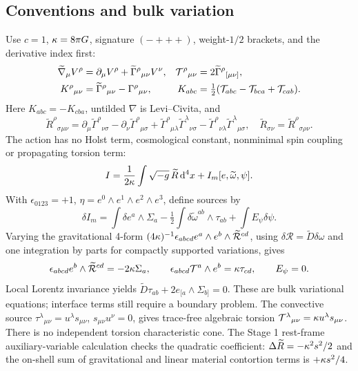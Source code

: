 \subsection{Conventions and bulk variation}
Use $c=1$, $\kappa=8\pi G$, signature $(-+++)$, weight-$1/2$ brackets, and the derivative index first:
\begin{align}
 \widetilde\nabla_\mu V^\rho&=\partial_\mu V^\rho+\widetilde\Gamma^\rho{}_{\mu\nu}V^\nu,&
 \mathcal T^\rho{}_{\mu\nu}&=2\widetilde\Gamma^\rho{}_{[\mu\nu]},\\
 K^\rho{}_{\mu\nu}&=\widetilde\Gamma^\rho{}_{\mu\nu}-\Gamma^\rho{}_{\mu\nu},&
 K_{abc}&=\tfrac12(\mathcal T_{abc}-\mathcal T_{bca}+\mathcal T_{cab}).
\end{align}
Here $K_{abc}=-K_{cba}$, untilded $\nabla$ is Levi--Civita, and
\begin{equation}
 \widetilde R^\rho{}_{\sigma\mu\nu}=\partial_\mu\widetilde\Gamma^\rho{}_{\nu\sigma}-\partial_\nu\widetilde\Gamma^\rho{}_{\mu\sigma}
 +\widetilde\Gamma^\rho{}_{\mu\lambda}\widetilde\Gamma^\lambda{}_{\nu\sigma}
 -\widetilde\Gamma^\rho{}_{\nu\lambda}\widetilde\Gamma^\lambda{}_{\mu\sigma},\quad
 \widetilde R_{\sigma\nu}=\widetilde R^\rho{}_{\sigma\rho\nu}.
\end{equation}
The action has no Holst term, cosmological constant, nonminimal spin coupling or propagating torsion term:
\begin{equation}
 I=\frac1{2\kappa}\int\sqrt{-g}\,\widetilde R\,\mathrm d^4x+I_m[e,\widetilde\omega,\psi].
\end{equation}
With $\epsilon_{0123}=+1$, $\eta=e^0\wedge e^1\wedge e^2\wedge e^3$, define sources by
\begin{equation}
 \delta I_m=\int\delta e^a\wedge\Sigma_a-\tfrac12\int\delta\widetilde\omega^{ab}\wedge\tau_{ab}+\int E_\psi\delta\psi.
\end{equation}
Varying the gravitational 4-form $(4\kappa)^{-1}\epsilon_{abcd}e^a\wedge e^b\wedge\widetilde{\mathcal R}^{cd}$, using $\delta\mathcal R=\widetilde D\delta\omega$ and one integration by parts for compactly supported variations, gives
\begin{equation}
 \epsilon_{abcd}e^b\wedge\widetilde{\mathcal R}^{cd}=-2\kappa\Sigma_a,
 \qquad \epsilon_{abcd}\mathcal T^a\wedge e^b=\kappa\tau_{cd},\qquad E_\psi=0.
\end{equation}
Local Lorentz invariance yields $\widetilde D\tau_{ab}+2e_{[a}\wedge\Sigma_{b]}=0$. These are bulk variational equations; interface terms still require a boundary problem. The convective source $\tau^\lambda{}_{\mu\nu}=u^\lambda s_{\mu\nu}$, $s_{\mu\nu}u^\nu=0$, gives trace-free algebraic torsion $\mathcal T^\lambda{}_{\mu\nu}=\kappa u^\lambda s_{\mu\nu}$. There is no independent torsion characteristic cone. The Stage 1 rest-frame auxiliary-variable calculation checks the quadratic coefficient: $\Delta\widetilde R=-\kappa^2s^2/2$ and the on-shell sum of gravitational and linear material contortion terms is $+\kappa s^2/4$.

